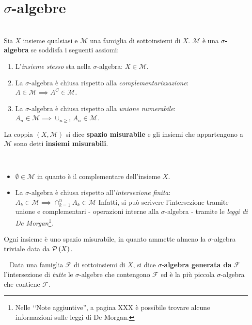 \section{$\sigma$-algebre}
\begin{define}~{}\\
	Sia $X$ insieme qualsiasi e $\mathcal{M}$ una famiglia di sottoinsiemi di $X$. $\mathcal{M}$ è una $\sigma$\textbf{-algebra}  se soddisfa i seguenti assiomi:
	\begin{enumerate}
		\item L'\textit{insieme stesso} sta nella $\sigma$-algebra: $X\in\mathcal{M}$.
		\item La $\sigma$-algebra è chiusa rispetto alla \textit{complementarizzazione}: $A\in\mathcal{M}\implies A^C\in\mathcal{M}$.
		\item La $\sigma$-algebra è chiusa rispetto alla \textit{unione numerabile}: $\displaystyle A_n\in\mathcal{M}\implies \cup_{n\geq 1}A_n\in\mathcal{M}$.
	\end{enumerate}
La coppia $\left(X,\mathcal{M}\right)$ si dice \textbf{spazio misurabile} e gli insiemi che appartengono a $\mathcal{M}$ sono detti \textbf{insiemi misurabili}.
\end{define}
\begin{observe}~{}
	\begin{itemize}
		\item $\emptyset\in\mathcal{M}$ in quanto è il complementare dell'insieme $X$.
		\item La $\sigma$-algebra è chiusa rispetto all'\textit{intersezione finita}: $A_k\in\mathcal{M}\implies\cap_{k=1}^{n}A_k\in\mathcal{M}$
		Infatti, si può scrivere l'intersezione tramite unione e complementari - operazioni interne alla $\sigma$-algebra - tramite le \textit{leggi di De Morgan}\footnote{Nelle ‘‘Note aggiuntive'', a pagina XXX è possibile trovare alcune informazioni sulle leggi di De Morgan.}.
	\end{itemize}
\end{observe}
\begin{example}
	Ogni insieme è uno spazio misurabile, in quanto ammette almeno la $\sigma$-algebra triviale data da $\mathcal{P}\left(X\right)$.
\end{example}
\begin{define}~{}
	Data una famiglia $\mathcal{F}$ di sottoinsiemi di $X$, si dice $\sigma$-\textbf{algebra generata da} $\mathcal{F}$ l'intersezione di \textit{tutte} le $\sigma$-algebre che contengono $\mathcal{F}$ ed è la più piccola $\sigma$-algebra che contiene $\mathcal{F}$.
\end{define}
